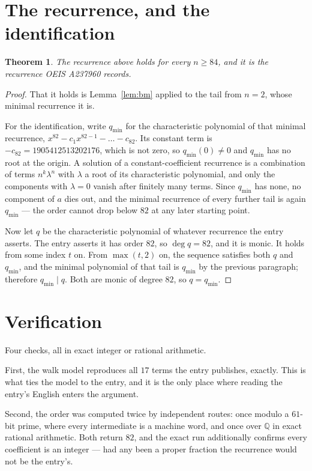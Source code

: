 \documentclass[11pt,a4paper]{article}
\theoremstyle{plain}
\newtheorem{theorem}{Theorem}
\theoremstyle{definition}
\begin{document}
\section{The recurrence, and the identification}

\begin{theorem}
The recurrence above holds for every $n\ge84$, and it is the recurrence OEIS A237960 records.
\end{theorem}

\begin{proof}
That it holds is Lemma~\ref{lem:bm} applied to the tail from $n=2$, whose minimal
recurrence it is.

For the identification, write $q_{\min}$ for the characteristic polynomial of that minimal
recurrence, $x^{82}-c_1x^{82-1}-\dots-c_{82}$. Its constant term is
$-c_{82}=1905412513202176$, which is not zero, so $q_{\min}(0)\neq0$ and $q_{\min}$ has no
root at the origin. A solution of a constant-coefficient recurrence is a combination of terms
$n^{k}\lambda^{n}$ with $\lambda$ a root of its characteristic polynomial, and only the
components with $\lambda=0$ vanish after finitely many terms. Since $q_{\min}$ has none, no
component of $a$ dies out, and the minimal recurrence of every further tail is again
$q_{\min}$ --- the order cannot drop below $82$ at any later starting point.

Now let $q$ be the characteristic polynomial of whatever recurrence the entry asserts. The
entry asserts it has order $82$, so $\deg q=82$, and it is monic. It holds from some
index $t$ on. From $\max(t,2)$ on, the sequence satisfies both $q$ and $q_{\min}$, and
the minimal polynomial of that tail is $q_{\min}$ by the previous paragraph; therefore
$q_{\min}\mid q$. Both are monic of degree $82$, so $q=q_{\min}$.
\end{proof}

\section{Verification}

Four checks, all in exact integer or rational arithmetic.

First, the walk model reproduces all $17$ terms the entry publishes, exactly. This is
what ties the model to the entry, and it is the only place where reading the entry's English
enters the argument.

Second, the order was computed twice by independent routes: once modulo a $61$-bit prime, where
every intermediate is a machine word, and once over $\mathbb{Q}$ in exact rational arithmetic.
Both return $82$, and the exact run additionally confirms every coefficient is an integer
--- had any been a proper fraction the recurrence would not be the entry's.
\end{document}
